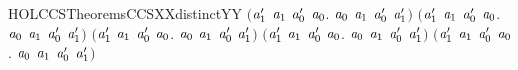 \begin{SaveVerbatim}{HOLCCSTheoremsCCSXXdistinctYY}
   \ensuremath{(}\HOLSymConst{\HOLTokenForall{}}\ensuremath{\HOLBoundVar{a}\sb{\mathrm{1}}\sp{\prime}} \ensuremath{\HOLBoundVar{a}\sb{\mathrm{1}}} \ensuremath{\HOLBoundVar{a}\sb{\mathrm{0}}\sp{\prime}} \ensuremath{\HOLBoundVar{a}\sb{\mathrm{0}}}. \ensuremath{\HOLBoundVar{a}\sb{\mathrm{0}}} \HOLSymConst{\ensuremath{+}} \ensuremath{\HOLBoundVar{a}\sb{\mathrm{1}}} \HOLSymConst{\HOLTokenNotEqual{}}  \ensuremath{\HOLBoundVar{a}\sb{\mathrm{0}}\sp{\prime}} \ensuremath{\HOLBoundVar{a}\sb{\mathrm{1}}\sp{\prime}}\ensuremath{)} \HOLSymConst{\HOLTokenConj{}}
   \ensuremath{(}\HOLSymConst{\HOLTokenForall{}}\ensuremath{\HOLBoundVar{a}\sb{\mathrm{1}}\sp{\prime}} \ensuremath{\HOLBoundVar{a}\sb{\mathrm{1}}} \ensuremath{\HOLBoundVar{a}\sb{\mathrm{0}}\sp{\prime}} \ensuremath{\HOLBoundVar{a}\sb{\mathrm{0}}}. \ensuremath{\HOLBoundVar{a}\sb{\mathrm{0}}} \HOLSymConst{\ensuremath{+}} \ensuremath{\HOLBoundVar{a}\sb{\mathrm{1}}} \HOLSymConst{\HOLTokenNotEqual{}}  \ensuremath{\HOLBoundVar{a}\sb{\mathrm{0}}\sp{\prime}} \ensuremath{\HOLBoundVar{a}\sb{\mathrm{1}}\sp{\prime}}\ensuremath{)} \HOLSymConst{\HOLTokenConj{}}
   \ensuremath{(}\HOLSymConst{\HOLTokenForall{}}\ensuremath{\HOLBoundVar{a}\sb{\mathrm{1}}\sp{\prime}} \ensuremath{\HOLBoundVar{a}\sb{\mathrm{1}}} \ensuremath{\HOLBoundVar{a}\sb{\mathrm{0}}\sp{\prime}} \ensuremath{\HOLBoundVar{a}\sb{\mathrm{0}}}. \ensuremath{\HOLBoundVar{a}\sb{\mathrm{0}}} \HOLSymConst{\ensuremath{\mid}} \ensuremath{\HOLBoundVar{a}\sb{\mathrm{1}}} \HOLSymConst{\HOLTokenNotEqual{}}  \ensuremath{\HOLBoundVar{a}\sb{\mathrm{0}}\sp{\prime}} \ensuremath{\HOLBoundVar{a}\sb{\mathrm{1}}\sp{\prime}}\ensuremath{)} \HOLSymConst{\HOLTokenConj{}}
   \ensuremath{(}\HOLSymConst{\HOLTokenForall{}}\ensuremath{\HOLBoundVar{a}\sb{\mathrm{1}}\sp{\prime}} \ensuremath{\HOLBoundVar{a}\sb{\mathrm{1}}} \ensuremath{\HOLBoundVar{a}\sb{\mathrm{0}}\sp{\prime}} \ensuremath{\HOLBoundVar{a}\sb{\mathrm{0}}}. \ensuremath{\HOLBoundVar{a}\sb{\mathrm{0}}} \HOLSymConst{\ensuremath{\mid}} \ensuremath{\HOLBoundVar{a}\sb{\mathrm{1}}} \HOLSymConst{\HOLTokenNotEqual{}}  \ensuremath{\HOLBoundVar{a}\sb{\mathrm{0}}\sp{\prime}} \ensuremath{\HOLBoundVar{a}\sb{\mathrm{1}}\sp{\prime}}\ensuremath{)} \HOLSymConst{\HOLTokenConj{}}
   \ensuremath{(}\HOLSymConst{\HOLTokenForall{}}\ensuremath{\HOLBoundVar{a}\sb{\mathrm{1}}\sp{\prime}} \ensuremath{\HOLBoundVar{a}\sb{\mathrm{1}}} \ensuremath{\HOLBoundVar{a}\sb{\mathrm{0}}\sp{\prime}} \ensuremath{\HOLBoundVar{a}\sb{\mathrm{0}}}. \ensuremath{\HOLBoundVar{a}\sb{\mathrm{0}}} \HOLSymConst{\ensuremath{\mid}} \ensuremath{\HOLBoundVar{a}\sb{\mathrm{1}}} \HOLSymConst{\HOLTokenNotEqual{}}  \ensuremath{\HOLBoundVar{a}\sb{\mathrm{0}}\sp{\prime}} \ensuremath{\HOLBoundVar{a}\sb{\mathrm{1}}\sp{\prime}}\ensuremath{)} \HOLSymConst{\HOLTokenConj{}}

\end{SaveVerbatim}
